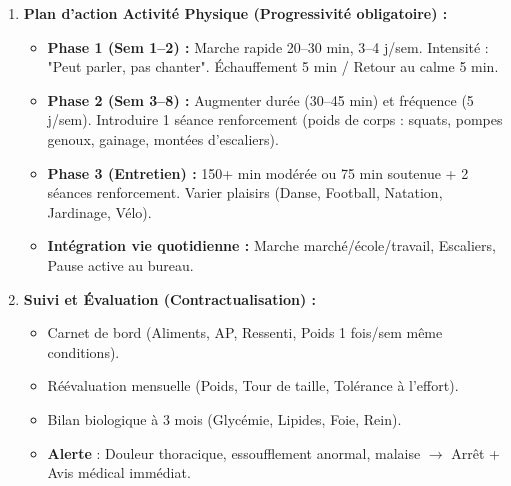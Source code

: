 \documentclass[11pt]{article}
\begin{document}
\begin{methode}
\begin{enumerate}
\begin{itemize}
\end{itemize}
\item \textbf{Plan d'action Activité Physique (Progressivité \textbf{obligatoire}) :}
\begin{itemize}
\item \textbf{Phase 1 (Sem 1--2) :} Marche rapide 20--30 min, 3--4 j/sem. Intensité : "Peut parler, pas chanter". Échauffement 5 min / Retour au calme 5 min.
\item \textbf{Phase 2 (Sem 3--8) :} Augmenter durée (30--45 min) et fréquence (5 j/sem). Introduire 1 séance renforcement (poids de corps : squats, pompes genoux, gainage, montées d'escaliers).
\item \textbf{Phase 3 (Entretien) :} 150+ min modérée ou 75 min soutenue + 2 séances renforcement. Varier plaisirs (Danse, Football, Natation, Jardinage, Vélo).
\item \textbf{Intégration vie quotidienne :} Marche marché/école/travail, Escaliers, Pause active au bureau.
\end{itemize}
\item \textbf{Suivi et Évaluation (Contractualisation) :}
\begin{itemize}
\item Carnet de bord (Aliments, AP, Ressenti, Poids 1 fois/sem même conditions).
\item Réévaluation mensuelle (Poids, Tour de taille, Tolérance à l'effort).
\item Bilan biologique à 3 mois (Glycémie, Lipides, Foie, Rein).
\item \textbf{Alerte} : Douleur thoracique, essoufflement anormal, malaise $\rightarrow$ Arrêt + Avis médical immédiat.
\end{itemize}
\end{enumerate}
\end{methode}
\end{document}
